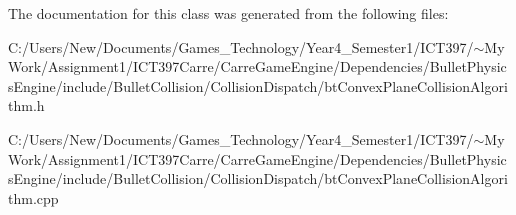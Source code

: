 The documentation for this class was generated from the following files:\begin{CompactItemize}
\item 
C:/Users/New/Documents/Games\_\-Technology/Year4\_\-Semester1/ICT397/$\sim$My Work/Assignment1/ICT397Carre/CarreGameEngine/Dependencies/BulletPhysicsEngine/include/BulletCollision/CollisionDispatch/btConvexPlaneCollisionAlgorithm.h\item 
C:/Users/New/Documents/Games\_\-Technology/Year4\_\-Semester1/ICT397/$\sim$My Work/Assignment1/ICT397Carre/CarreGameEngine/Dependencies/BulletPhysicsEngine/include/BulletCollision/CollisionDispatch/btConvexPlaneCollisionAlgorithm.cpp\end{CompactItemize}
